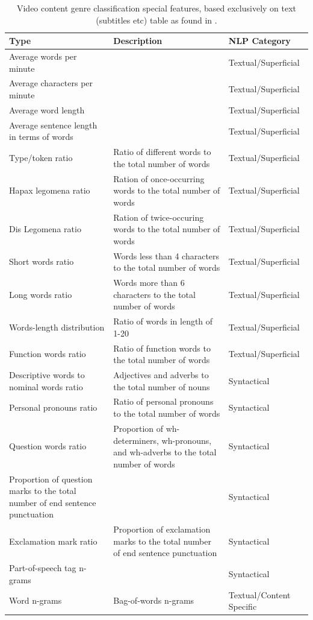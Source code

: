 \begin{table}[t]
	\center
	\caption {Video content genre classification special features, based exclusively on text (subtitles etc) table as found in  \parencite{lee2017text}.}\label{chap:relevant_work:tbl:videogenre_textbased_special_features}
	\begin{tabular}{p{4cm}p{7cm}p{3cm}}
		\hline
		Type & Description & NLP Category \\
		\hline
		Average words per minute & & Textual/Superficial  \\
        Average characters per minute & & Textual/Superficial  \\
        Average word length & & Textual/Superficial  \\
        Average sentence length in terms of words & & Textual/Superficial  \\
        Type/token ratio & Ratio of different words to the total number of words & Textual/Superficial  \\
        Hapax legomena ratio & Ration of once-occurring words to the total number of words  & Textual/Superficial  \\
        Dis Legomena ratio & Ration of twice-occuring words to the total number of words  & Textual/Superficial  \\
        Short words ratio & Words less than 4 characters to the total number of words & Textual/Superficial  \\
        Long words ratio & Words more than 6 characters to the total number of words & Textual/Superficial  \\
        Words-length distribution & Ratio of words in length of 1-20 & Textual/Superficial  \\
        Function words ratio & Ratio of function words to the total number of words  & Textual/Superficial  \\
        Descriptive words to nominal words ratio & Adjectives and adverbs to the total number of nouns & Syntactical \\
        Personal pronouns ratio & Ratio of personal pronouns to the total number of words & Syntactical \\
        Question words ratio & Proportion of wh-determiners, wh-pronouns, and wh-adverbs to the total number of words & Syntactical \\
        Proportion of question marks to the total number of end sentence punctuation & & Syntactical \\
        Exclamation mark ratio & Proportion of exclamation marks to the total number of end sentence punctuation & Syntactical \\
        Part-of-speech tag n-grams & & Syntactical \\
        Word n-grams & Bag-of-words n-grams  & Textual/Content Specific \\
  		\hline
	\end{tabular}
\end{table}

